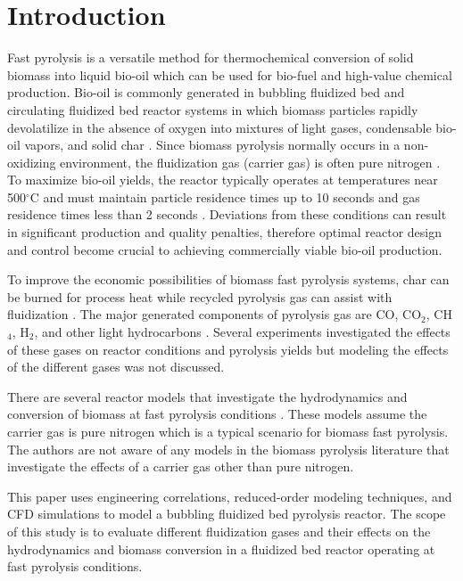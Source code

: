 
\section{Introduction}

Fast pyrolysis is a versatile method for thermochemical conversion of solid biomass into liquid bio-oil which can be used for bio-fuel and high-value chemical production. Bio-oil is commonly generated in bubbling fluidized bed and circulating fluidized bed reactor systems in which biomass particles rapidly devolatilize in the absence of oxygen into mixtures of light gases, condensable bio-oil vapors, and solid char \cite{Bridgwater-1999, Bridgwater-2018a, Mohan-2006}. Since biomass pyrolysis normally occurs in a non-oxidizing environment, the fluidization gas (carrier gas) is often pure nitrogen \cite{Mohan-2006}. To maximize bio-oil yields, the reactor typically operates at temperatures near 500$^\circ$C and must maintain particle residence times up to 10 seconds and gas residence times less than 2 seconds \cite{Bridgwater-2018a}. Deviations from these conditions can result in significant production and quality penalties, therefore optimal reactor design and control become crucial to achieving commercially viable bio-oil production.

To improve the economic possibilities of biomass fast pyrolysis systems, char can be burned for process heat while recycled pyrolysis gas can assist with fluidization \cite{Bridgwater-1999, Mante-2012}. The major generated components of pyrolysis gas are CO, CO$_2$, CH$_4$, H$_2$, and other light hydrocarbons \cite{Asadullah-2008, Zhang-2011}. Several experiments investigated the effects of these gases on reactor conditions and pyrolysis yields \cite{Mante-2012, Mullen-2013, Zhang-2011} but modeling the effects of the different gases was not discussed.

There are several reactor models that investigate the hydrodynamics and conversion of biomass at fast pyrolysis conditions \cite{Papadikis-2009, Papadikis-2010, Mellin-2014, Xiong-2016, Xue-2011}. These models assume the carrier gas is pure nitrogen which is a typical scenario for biomass fast pyrolysis. The authors are not aware of any models in the biomass pyrolysis literature that investigate the effects of a carrier gas other than pure nitrogen.

This paper uses engineering correlations, reduced-order modeling techniques, and CFD simulations to model a bubbling fluidized bed pyrolysis reactor. The scope of this study is to evaluate different fluidization gases and their effects on the hydrodynamics and biomass conversion in a fluidized bed reactor operating at fast pyrolysis conditions.
